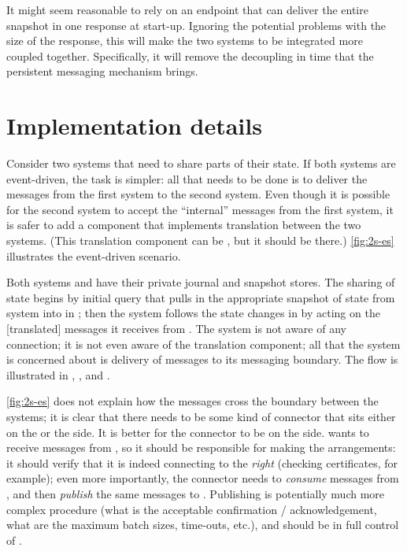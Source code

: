 It might seem reasonable to rely on an endpoint that can deliver the entire snapshot in one response at start-up. Ignoring the potential problems with the size of the response, this will make the two systems to be integrated more coupled together. Specifically, it will remove the decoupling in time that the persistent messaging mechanism brings. 


\section{Implementation details}
Consider two systems that need to share parts of their state. If both systems are event-driven, the task is simpler: all that needs to be done is to deliver the messages from the first system to the second system. Even though it is possible for the second system to accept the ``internal'' messages from the first system, it is safer to add a component that implements translation between the two systems. (This translation component can be , but it should be there.) \autoref{fig:2s-es} illustrates the event-driven scenario.


Both systems  and  have their private journal and snapshot stores. The sharing of state begins by initial query that pulls in the appropriate snapshot of state from system  into  in ; then the system  follows the state changes in  by acting on the [translated] messages it receives from . The system  is not aware of any connection; it is not even aware of the translation component; all that the system  is concerned about is delivery of messages to its messaging boundary. The flow is illustrated in , , and .

\autoref{fig:2s-es} does not explain how the messages cross the boundary between the systems; it is clear that there needs to be some kind of connector that sits either on the  or the  side. It is better for the connector to be on the  side.  wants to receive messages from , so it should be responsible for making the arrangements: it should verify that it is indeed connecting to the \emph{right}  (checking certificates, for example); even more importantly, the connector needs to \emph{consume} messages from , and then \emph{publish} the same messages to . Publishing is potentially much more complex procedure (what is the acceptable confirmation / acknowledgement, what are the maximum batch sizes, time-outs, etc.), and should be in full control of \cite{mirrormaker}.  

